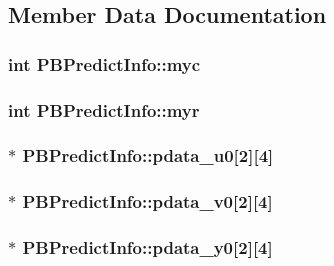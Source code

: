 \subsection{Member Data Documentation}
\hypertarget{struct_p_b_predict_info_ac46c76693de4dab4a105494d1220dc0a}{
\subsubsection[{myc}]{\setlength{\rightskip}{0pt plus 5cm}int {\bf PBPredictInfo::myc}}}
\label{struct_p_b_predict_info_ac46c76693de4dab4a105494d1220dc0a}
\hypertarget{struct_p_b_predict_info_a1eda4a8837300bed803d81ada5dfbb30}{
\subsubsection[{myr}]{\setlength{\rightskip}{0pt plus 5cm}int {\bf PBPredictInfo::myr}}}
\label{struct_p_b_predict_info_a1eda4a8837300bed803d81ada5dfbb30}
\hypertarget{struct_p_b_predict_info_aaf07e44714249f4131c030df88bf8169}{
\subsubsection[{pdata\_\-u0}]{$\ast$ {\bf PBPredictInfo::pdata\_\-u0}\mbox{[}2\mbox{]}\mbox{[}4\mbox{]}}}
\label{struct_p_b_predict_info_aaf07e44714249f4131c030df88bf8169}
\hypertarget{struct_p_b_predict_info_a8dc8f424bcb4274ef583207aa9827962}{
\subsubsection[{pdata\_\-v0}]{$\ast$ {\bf PBPredictInfo::pdata\_\-v0}\mbox{[}2\mbox{]}\mbox{[}4\mbox{]}}}
\label{struct_p_b_predict_info_a8dc8f424bcb4274ef583207aa9827962}
\hypertarget{struct_p_b_predict_info_a7c7d2c72aa539c0e2365b4e04e18a0ca}{
\subsubsection[{pdata\_\-y0}]{$\ast$ {\bf PBPredictInfo::pdata\_\-y0}\mbox{[}2\mbox{]}\mbox{[}4\mbox{]}}}
